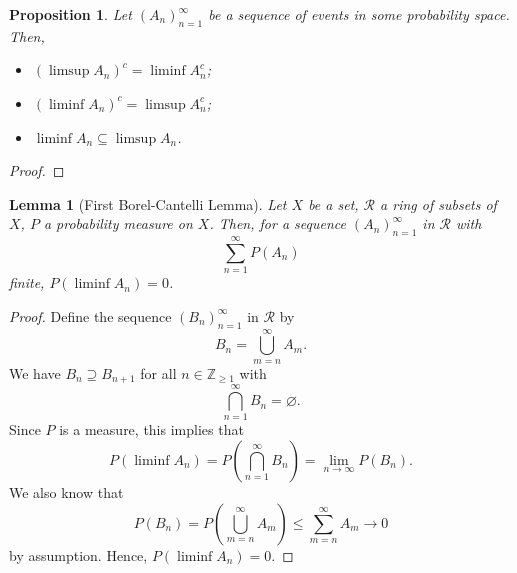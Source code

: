 \documentclass[a4paper, openany]{memoir}
\theoremstyle{definition}
\theoremstyle{plain}
\newtheorem{lemma}[definition]{Lemma}
\newtheorem{proposition}[definition]{Proposition}
\begin{document}
    \begin{proposition}
        Let $(A_n)_{n=1}^\infty$ be a sequence of events in some probability space. Then,
        \begin{itemize}
            \item $(\limsup A_n)^c = \liminf A_n^c$;
            \item $(\liminf A_n)^c = \limsup A_n^c$;
            \item $\liminf A_n \subseteq \limsup A_n$.
        \end{itemize}
    \end{proposition}
    \begin{proof}
        
    \end{proof}

    \begin{lemma}[First Borel-Cantelli Lemma]
        Let $X$ be a set, $\mathcal{R}$ a ring of subsets of $X$, $P$ a probability measure on $X$. Then, for a sequence $(A_n)_{n=1}^\infty$ in $\mathcal{R}$ with 
        \[\sum_{n=1}^\infty P(A_n)\]
        finite, $P(\liminf A_n) = 0$.
    \end{lemma}
    \begin{proof}
        Define the sequence $(B_n)_{n=1}^\infty$ in $\mathcal{R}$ by
        \[B_n = \bigcup_{m=n}^\infty A_m.\]
        We have $B_n \supseteq B_{n+1}$ for all $n \in \mathbb{Z}_{\geq 1}$ with
        \[\bigcap_{n=1}^\infty B_n = \varnothing.\]
        Since $P$ is a measure, this implies that
        \[P(\liminf A_n) = P \left(\bigcap_{n=1}^\infty B_n\right) = \lim_{n \to \infty} P(B_n).\]
        We also know that
        \[P(B_n) = P \left(\bigcup_{m=n}^\infty A_m\right) \leq \sum_{m=n}^\infty A_m \to 0\]
        by assumption. Hence, $P(\liminf A_n) = 0$.
    \end{proof}
\end{document}

